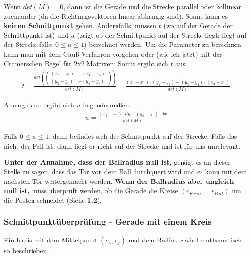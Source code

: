 \documentclass[a4paper,10pt,ngerman]{scrartcl}
\begin{document}
\begin{itemize}
  Wenn $det(M) = 0$, dann ist die Gerade und die Strecke parallel  oder kollinear zueinander (da die Richtungsvektoren linear abhängig sind). Somit kann es \textbf{keinen Schnittpunkt} geben.
  \newline
  Andernfalls, müssen $t$ (wo auf der Gerade der Schnittpunkt ist) und $u$ (zeigt ob der Schnittpunkt auf der Strecke liegt; liegt auf der Strecke falls: $0 \leq u \leq 1$) berechnet werden.
  \newline
  Um die Parameter zu berechnen kann man mit dem Gauß-Verfahren vorgehen oder (wie ich jetzt) mit der Cramerschen Regel für 2x2 Matrixen:
  \newline
  \newline
  Somit ergibt sich $t$ aus:
  \begin{align*}
    t = 
    \frac{
      det(
        \begin{pmatrix}
          (x_{3} - x_{1}) & -(x_{4} - x_{3})\\
          (y_{3} - y_{1}) & -(y_{4} - y_{3})
        \end{pmatrix}
      )
    }{
      det(M)
    }
    = \frac{(x_{3}- x_{1}) \cdot (y_{4}- y_{3}) - (y_{3} - y_{1}) \cdot (x_{4} - x_{3})}{det(M)}
  \end{align*}

  Analog dazu ergibt sich $u$ folgendermaßen:
  \begin{align*}
    u = \frac{(x_{3}- x_{1}) \cdot dy - (y_{3} - y_{1}) \cdot dx}{det(M)}
  \end{align*}

  Falls $0 \leq u \leq 1$, dann befindet sich der Schnittpunkt auf der Strecke. Falls das nicht der Fall ist, dann liegt er nicht auf der Strecke und ist für uns unrelevant.

  \textbf{Unter der Annahme, dass der Ballradius null ist,} genügt es an dieser Stelle zu sagen, dass das Tor von dem Ball durchquert wird und es kann mit dem nächsten Tor weitergemacht werden.
  \newline
  \newline 
  \textbf{Wenn der Ballradius aber ungleich null ist,} muss überprüft werden, ob die Gerade die Kreise $(r_{Kreis} = r_{Ball})$ um die Posten schneidet (Siehe \textbf{1.2}).

  \subsubsection{Schnittpunktüberprüfung - Gerade mit einem Kreis}

  Ein Kreis mit dem Mittelpunkt $(c_{x}, c_{y})$ und dem Radius $r$ wird mathematisch so beschrieben:


\end{itemize}
\end{document}
